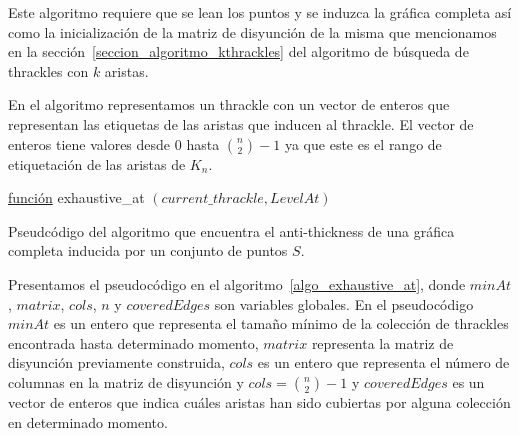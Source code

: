   Este algoritmo requiere que se lean los puntos y se induzca la gráfica completa así como la inicialización
  de la matriz de disyunción de la misma que mencionamos en la sección~\ref{seccion_algoritmo_kthrackles}
  del algoritmo de búsqueda de thrackles con $k$ aristas.

  En el algoritmo representamos un thrackle con un vector de enteros que representan las etiquetas de las
  aristas que inducen al thrackle. El vector de enteros tiene valores desde $0$ hasta $\binom{n}{2}-1$ ya que este es el rango de etiquetación de las aristas de $K_n$.
  \begin{algorithm}[p]
    \DontPrintSemicolon
    \underline{función} exhaustive\_at $ (current\_thrackle,LevelAt) $\;
    \caption{Pseudcódigo del algoritmo que encuentra el anti-thickness de una gráfica completa inducida por
    un conjunto de puntos $S$.}
    \label{algo_exhaustive_at}
  \end{algorithm}

  Presentamos el pseudocódigo en el algoritmo~\ref{algo_exhaustive_at}, donde
  $minAt$, $matrix$, $cols$, $n$ y $coveredEdges$ son variables globales. En el pseudocódigo $minAt$ es un
  entero que representa el tamaño mínimo de la colección de thrackles encontrada hasta determinado momento,
  $matrix$ representa la matriz de disyunción previamente construida, $cols$ es un entero que representa el
  número de columnas en la matriz de disyunción y $cols=\binom{n}{2}-1$ y $coveredEdges$ es un vector de
  enteros que indica cuáles aristas han sido cubiertas por alguna colección en determinado momento.

